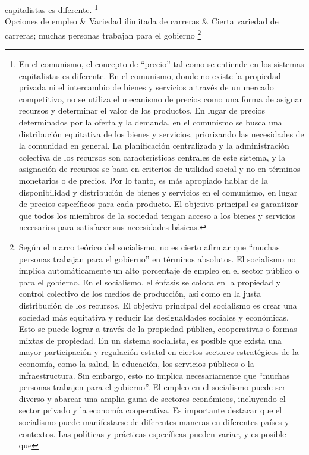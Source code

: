 \documentclass[
  man,
  floatsintext,
  longtable,
  a4paper,
  nolmodern,
  notxfonts,
  notimes,
  12pt,
  colorlinks=true,linkcolor=blue,citecolor=blue,urlcolor=blue]{apa7}
\begin{document}
{\begin{longtable}[]
capitalistas es diferente. \footnote{En el comunismo, el concepto de
  ``precio'' tal como se entiende en los sistemas capitalistas es
  diferente. En el comunismo, donde no existe la propiedad privada ni el
  intercambio de bienes y servicios a través de un mercado competitivo,
  no se utiliza el mecanismo de precios como una forma de asignar
  recursos y determinar el valor de los productos. En lugar de precios
  determinados por la oferta y la demanda, en el comunismo se busca una
  distribución equitativa de los bienes y servicios, priorizando las
  necesidades de la comunidad en general. La planificación centralizada
  y la administración colectiva de los recursos son características
  centrales de este sistema, y la asignación de recursos se basa en
  criterios de utilidad social y no en términos monetarios o de precios.
  Por lo tanto, es más apropiado hablar de la disponibilidad y
  distribución de bienes y servicios en el comunismo, en lugar de
  precios específicos para cada producto. El objetivo principal es
  garantizar que todos los miembros de la sociedad tengan acceso a los
  bienes y servicios necesarios para satisfacer sus necesidades básicas.} \\
Opciones de empleo & Variedad ilimitada de carreras & Cierta variedad de
carreras; muchas personas trabajan para el gobierno \footnote{Según el
  marco teórico del socialismo, no es cierto afirmar que ``muchas
  personas trabajan para el gobierno'' en términos absolutos. El
  socialismo no implica automáticamente un alto porcentaje de empleo en
  el sector público o para el gobierno. En el socialismo, el énfasis se
  coloca en la propiedad y control colectivo de los medios de
  producción, así como en la justa distribución de los recursos. El
  objetivo principal del socialismo es crear una sociedad más equitativa
  y reducir las desigualdades sociales y económicas. Esto se puede
  lograr a través de la propiedad pública, cooperativas o formas mixtas
  de propiedad. En un sistema socialista, es posible que exista una
  mayor participación y regulación estatal en ciertos sectores
  estratégicos de la economía, como la salud, la educación, los
  servicios públicos o la infraestructura. Sin embargo, esto no implica
  necesariamente que ``muchas personas trabajen para el gobierno''. El
  empleo en el socialismo puede ser diverso y abarcar una amplia gama de
  sectores económicos, incluyendo el sector privado y la economía
  cooperativa. Es importante destacar que el socialismo puede
  manifestarse de diferentes maneras en diferentes países y contextos.
  Las políticas y prácticas específicas pueden variar, y es posible que
}
\end{longtable}}
\end{document}
